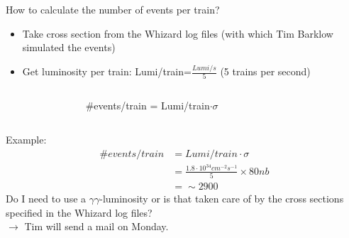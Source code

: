 \documentclass[xcolor={dvipsnames}]{beamer}
\newcommand{\ilclogo}{
  \setlength{\TPHorizModule}{1pt}
  \setlength{\TPVertModule}{1pt}
  \begin{textblock}{1}(323,12)
   \texttt{[image: figures/ILC.jpeg]}
  \end{textblock}
}
\begin{document}
\begin{frame}
How to calculate the number of events per train?
\begin{itemize}
 \item Take cross section from the Whizard log files (with which Tim Barklow simulated the events)
 \item Get luminosity per train: Lumi/train=$\frac{Lumi/s}{5}$ (5 trains per second)
\end{itemize}
\begin{columns}[t]
\begin{column}{0.2\textwidth}
\end{column}
\begin{column}[t]{0.5\textwidth}
  \begin{block}{} 
  \#events/train = Lumi/train$ \cdot \sigma$ 
  \end{block}
 \end{column}
 \begin{column}[t]{0.3\textwidth}
\end{column}
\end{columns}
{\color{gray}
Example:
\begin{align*}
 \#events/train &= Lumi/train \cdot \sigma\\
 &= \frac{1.8\cdot10^{34}cm^{-2}s^{-1}}{5} \times 80 nb\\
 &= \sim 2900
\end{align*}
}
Do I need to use a $\gamma\gamma$-luminosity or is that taken care of by the cross sections specified in the Whizard log files?\\
$\rightarrow$ Tim will send a mail on Monday.
\end{frame}

\end{document}

